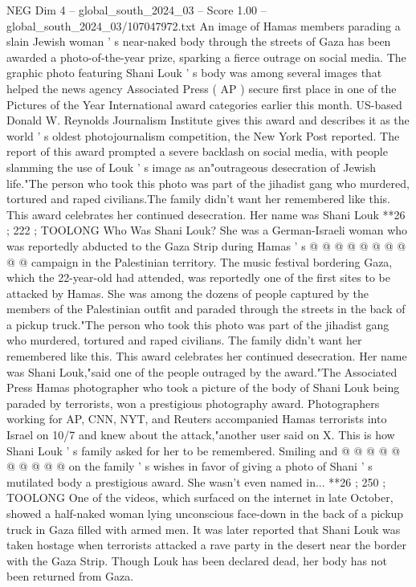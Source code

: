 \begin{textsample}{NEG Dim 4 – global\_south\_2024\_03 – Score 1.00 – global\_south\_2024\_03/107047972.txt}  \label{ex:f4_neg_355}
An image of Hamas members parading a slain Jewish woman ' s near-naked body through the streets of Gaza has been awarded a photo-of-the-year prize, sparking a fierce outrage on social media.
The graphic photo featuring Shani Louk ' s body was among several images that helped the news agency Associated Press ( AP ) secure first place in one of the Pictures of the Year International award categories earlier this month.
US-based Donald W.
Reynolds Journalism Institute gives this award and describes it as the world ' s oldest photojournalism competition, the New York Post reported.
The report of this award prompted a severe backlash on social media, with people slamming the use of Louk ' s image as an"outrageous desecration of Jewish life."The person who took this photo was part of the jihadist gang who murdered, tortured and raped civilians.The family didn't want her remembered like this.
This award celebrates her continued desecration.
Her name was Shani Louk **26 ; 222 ; TOOLONG Who Was Shani Louk?
She was a German-Israeli woman who was reportedly abducted to the Gaza Strip during Hamas ' s @ @ @ @ @ @ @ @ @ @ campaign in the Palestinian territory.
The music festival bordering Gaza, which the 22-year-old had attended, was reportedly one of the first sites to be attacked by Hamas.
She was among the dozens of people captured by the members of the Palestinian outfit and paraded through the streets in the back of a pickup truck."The person who took this photo was part of the jihadist gang who murdered, tortured and raped civilians.
The family didn't want her remembered like this.
This award celebrates her continued desecration.
Her name was Shani Louk,"said one of the people outraged by the award."The Associated Press Hamas photographer who took a picture of the body of Shani Louk being paraded by terrorists, won a prestigious photography award.
Photographers working for AP, CNN, NYT, and Reuters accompanied Hamas terrorists into Israel on 10/7 and knew about the attack,"another user said on X.
This is how Shani Louk ' s family asked for her to be remembered.
Smiling and @ @ @ @ @ @ @ @ @ @ on the family ' s wishes in favor of giving a photo of Shani ' s mutilated body a prestigious award.
She wasn't even named in... **26 ; 250 ; TOOLONG One of the videos, which surfaced on the internet in late October, showed a half-naked woman lying unconscious face-down in the back of a pickup truck in Gaza filled with armed men.
It was later reported that Shani Louk was taken hostage when terrorists attacked a rave party in the desert near the border with the Gaza Strip.
Though Louk has been declared dead, her body has not been returned from Gaza.

\end{textsample}
